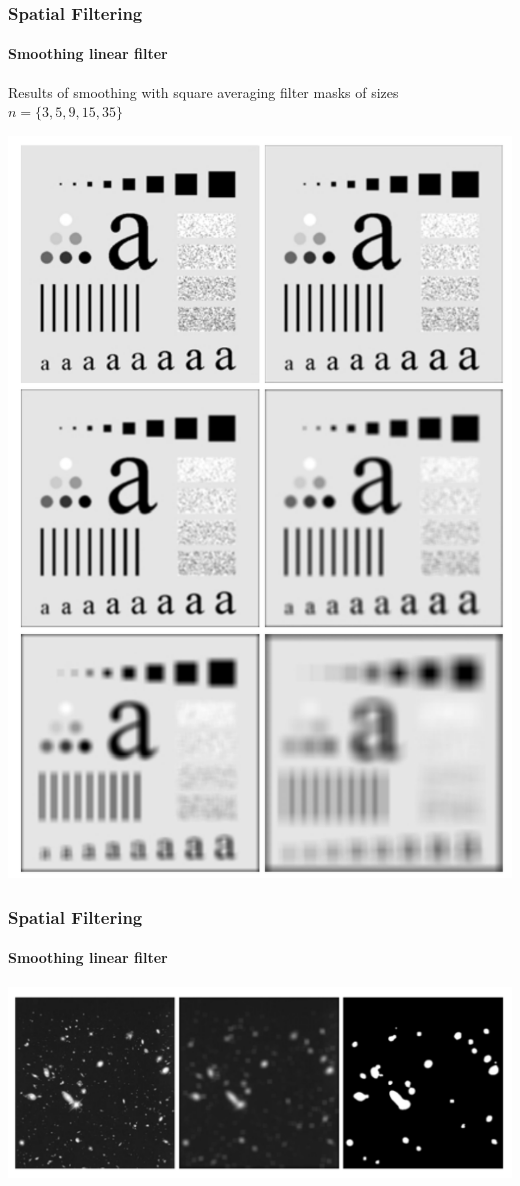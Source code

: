 \documentclass[table]{beamer}
\begin{document}
\begin{frame}
\frametitle{Spatial Filtering}
\framesubtitle{Smoothing linear filter}
Results of smoothing with square averaging filter masks of sizes $n=\{3, 5, 9, 15, 35\}$
\begin{center}\includegraphics[scale=0.19]{images/Spatial4-averagefilter.png}\end{center}
\end{frame}

\begin{frame}
\frametitle{Spatial Filtering}
\framesubtitle{Smoothing linear filter} 
\begin{center}
\includegraphics[scale=0.3]{images/Spatial5-averagefilter.png}
\end{center}
\end{frame}
\end{document}
